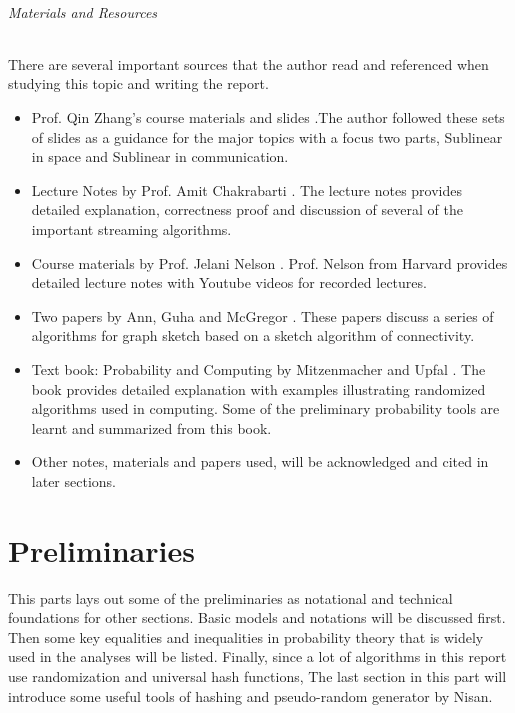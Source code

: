 \documentclass[11pt]{article}
\theoremstyle{plain}
\begin{document}
\paragraph{Materials and Resources }
There are several important sources that the author read and referenced 
when studying this topic and writing the report. 
\begin{itemize}
	\item Prof. Qin Zhang's course materials and 
	slides  \cite{zhang2017-slides}.The author followed these sets of slides as 
	a guidance for the major topics with a focus two parts, Sublinear in space 
	and Sublinear in communication. 
	\item Lecture Notes by Prof. Amit Chakrabarti  \cite{Cha2015-notes}. The 
	lecture notes provides detailed explanation, correctness proof and 
	discussion of several of the important streaming algorithms. 
	\item Course materials  by Prof. Jelani Nelson  \cite{Nel2015-web}. Prof. 
	Nelson from Harvard provides detailed lecture notes with Youtube videos 
	for recorded lectures. 
	\item Two papers by Ann, Guha and 
	McGregor  \cite{AGM2012-analyzing}  \cite{AGM2012-graph}. These 
	papers discuss a series of algorithms for graph sketch based on a sketch 
	algorithm of connectivity. 
	\item Text book: Probability and Computing by Mitzenmacher and 
	Upfal  \cite{MU-probability}. The book provides detailed explanation with 
	examples illustrating randomized algorithms used in computing. Some of 
	the preliminary probability tools are learnt and summarized from this book.
	\item Other notes, materials and papers used, will be acknowledged and 
	cited in later sections.
\end{itemize}

\pagebreak
\part{Preliminaries}
\label{p:pre}

This parts lays out some of the preliminaries as notational and technical 
foundations for other sections. Basic models and notations will be discussed 
first. Then some key equalities and inequalities in probability theory that is 
widely used in the analyses will be listed. Finally, since a lot of algorithms in 
this report use randomization and universal hash functions, The last section 
in this part will introduce some useful tools of hashing and 
pseudo-random generator by Nisan. 
\end{document}
